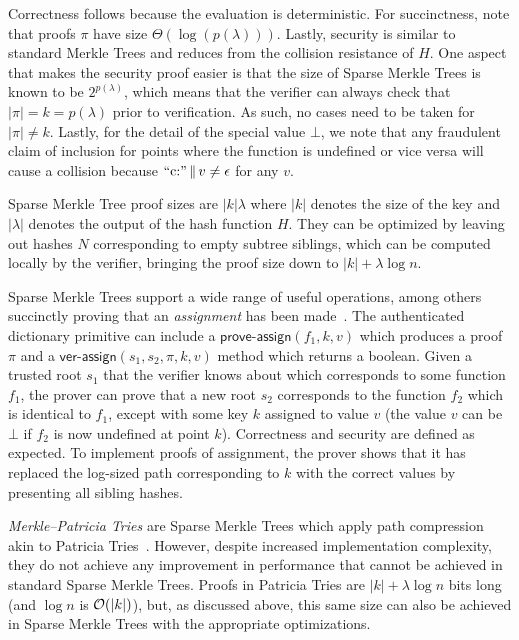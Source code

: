 Correctness follows because the evaluation is deterministic. For succinctness,
note that proofs $\pi$ have size $\Theta(\log(p(\lambda)))$. Lastly, security
is similar to standard Merkle Trees and reduces from the collision resistance
of $H$. One aspect that makes the security proof easier is that the size of
Sparse Merkle Trees is known to be $2^{p(\lambda)}$, which means that the
verifier can always check that $|\pi| = k = p(\lambda)$ prior to verification.
As such, no cases need to be taken for $|\pi| \neq k$. Lastly, for the detail
of the special value $\bot$, we note that any fraudulent claim of inclusion for
points where the function is undefined or vice versa will cause a collision
because $\text{``c:''} \,\|\, v \neq \epsilon$ for any $v$.

Sparse Merkle Tree proof sizes are $|k|\lambda$ where $|k|$ denotes the size of
the key and $|\lambda|$ denotes the output of the hash function $H$. They can be
optimized by leaving out hashes $N$ corresponding to empty subtree siblings,
which can be computed locally by the verifier, bringing the proof size down to
$|k| + \lambda\log{n}$.

Sparse Merkle Trees support a wide range of useful operations, among others
succinctly proving that an \emph{assignment} has been made~\cite{edrax}. The
authenticated dictionary primitive can include a
$\textsf{prove-assign}(f_1, k, v)$ which produces a proof $\pi$ and a
$\textsf{ver-assign}(s_1, s_2, \pi, k, v)$
method which returns a boolean. Given a trusted root $s_1$ that the verifier
knows about which corresponds to some function $f_1$, the prover can prove that a
new root $s_2$ corresponds to the function $f_2$ which is identical to $f_1$,
except with some key $k$ assigned to value $v$ (the value $v$ can be $\bot$
if $f_2$ is now undefined at point $k$). Correctness and security are defined as
expected. To implement proofs of assignment, the prover shows that it has
replaced the log-sized path corresponding to $k$ with the correct values by
presenting all sibling hashes.

\begin{remark}
\emph{Merkle--Patricia Tries} are Sparse Merkle
Trees which apply path compression akin to Patricia Tries~\cite{patricia}.
However, despite increased implementation complexity, they do not achieve any
improvement in performance that cannot be achieved in standard Sparse Merkle
Trees. Proofs in Patricia Tries are
$|k| + \lambda\log{n}$ bits long (and $\log{n}$ is $\mathcal{O}(|k|)$), but, as
discussed above, this same size can also be achieved in Sparse Merkle Trees with
the appropriate optimizations.
\end{remark}

